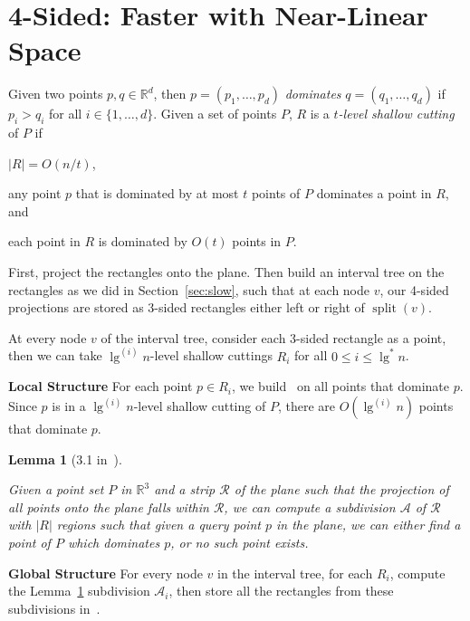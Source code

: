 \documentclass[letterpaper,12pt,twocolumn]{article}
\newcommand\lspace{\hspace{-0.5em}}
\DeclareMathOperator{\splt}{split}
\newcommand{\BigOh}[1]{O\!\left(#1\right)}
\newcommand\IR{\mathbb{R}}
\theoremstyle{plain}
\newtheorem{lemma}{Lemma}
\begin{document}
\section{\lspace{} 4-Sided: Faster with Near-Linear Space}
\label{sec:4sided}

Given two points $p,q \in \IR^d$, then $p = (p_1, \ldots, p_d)$
\emph{dominates} $q = (q_1, \ldots, q_d)$ if $p_i > q_i$ for all $i
\in \{1, \ldots, d \}$.  Given a set of points $P$, $R$ is a
\emph{$t$-level shallow cutting} of $P$ if
%
\begin{enumerate*}[label=(\roman*)] %
\item $|R| = \BigOh{n/t}$,
\item any point $p$ that is dominated by at most $t$ points of $P$
  dominates a point in $R$, and
\item each point in $R$ is dominated by $\BigOh{t}$ points in $P$.
\end{enumerate*}

First, project the rectangles onto the plane.  Then build an interval
tree on the rectangles as we did in Section~\ref{sec:slow}, such that
at each node $v$, our 4-sided projections are stored as 3-sided
rectangles either left or right of $\splt(v)$.

At every node $v$ of the interval tree, consider each 3-sided
rectangle as a point, then we can take $\lg^{(i)} n$-level shallow
cuttings $R_i$ for all $0 \le i \le \lg^* n$.

\textbf{Local Structure} For each point $p \in R_i$, we
build~\cite{afshani2008dominance} on all points that dominate $p$.
Since $p$ is in a $\lg^{(i)} n$-level shallow cutting of $P$, there
are $\BigOh{\lg^{(i)} n}$ points that dominate $p$.

\begin{lemma}[3.1 in~\cite{rahul2015improved}]\label{lem:31}

  Given a point set $P$ in $\IR^3$ and a strip $\mathcal{R}$ of the
  plane such that the projection of all points onto the plane falls
  within $\mathcal{R}$, we can compute a subdivision $\mathcal{A}$ of
  $\mathcal{R}$ with $|R|$ regions such that given a query point $p$
  in the plane, we can either find a point of $P$ which dominates $p$,
  or no such point exists.

\end{lemma}

\textbf{Global Structure} For every node $v$ in the interval tree, for
each $R_i$, compute the Lemma~\ref{lem:31} subdivision
$\mathcal{A}_i$, then store all the rectangles from these subdivisions
in~\cite{chazelle1986filtering}.
\end{document}
